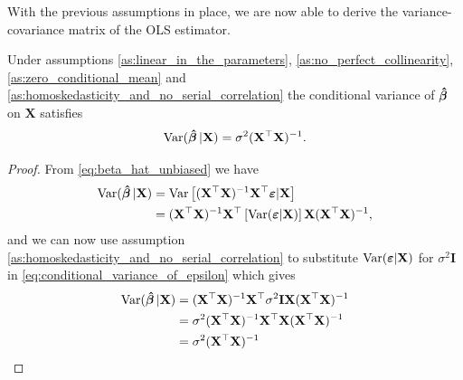 With the previous assumptions in place, we are now able to derive the variance-covariance matrix of the OLS estimator.
\begin{theorem}\label{th:variance-covariance_of_the_ols_estimator}
    Under assumptions \ref{as:linear_in_the_parameters}, \ref{as:no_perfect_collinearity}, \ref{as:zero_conditional_mean} and \ref{as:homoskedasticity_and_no_serial_correlation} the conditional variance of $\operatorname{\boldsymbol{\hat{\beta}}}$ on $\mathbf{X}$ satisfies
    \begin{align*}
        \operatorname{\text{Var}}(\operatorname{\boldsymbol{\hat{\beta}}} | \mathbf{X}) = \sigma^2(\mathbf{X}^\top\mathbf{X})^{-1}.
    \end{align*}
\end{theorem}
\begin{proof}
    From \eqref{eq:beta_hat_unbiased} we have
    \begin{align}
        \operatorname{\text{Var}}(\operatorname{\boldsymbol{\hat{\beta}}} | \mathbf{X}) &= \operatorname{\text{Var}}\left[ (\mathbf{X}^\top\mathbf{X})^{-1}\mathbf{X}^\top\boldsymbol{\varepsilon}|\mathbf{X} \right] \nonumber\\
        &= (\mathbf{X}^\top\mathbf{X})^{-1}\mathbf{X}^\top\left[ \operatorname{\text{Var}}(\boldsymbol{\varepsilon} | \mathbf{X}) \right] \mathbf{X}(\mathbf{X}^\top\mathbf{X})^{-1}, \label{eq:conditional_variance_of_epsilon}
    \end{align}
    and we can now use assumption \ref{as:homoskedasticity_and_no_serial_correlation} to substitute $\operatorname{\text{Var}}(\boldsymbol{\varepsilon}|\mathbf{X})$ for $\sigma^2 \mathbf{I}$ in \eqref{eq:conditional_variance_of_epsilon} which gives
    \begin{align*}
        \operatorname{\text{Var}}(\operatorname{\boldsymbol{\hat{\beta}}} | \mathbf{X}) &= (\mathbf{X}^\top\mathbf{X})^{-1}\mathbf{X}^\top\sigma^2 \mathbf{I} \mathbf{X}(\mathbf{X}^\top\mathbf{X})^{-1} \\
        &= \sigma^2(\mathbf{X}^\top\mathbf{X})^{-1}\mathbf{X}^\top \mathbf{X}(\mathbf{X}^\top\mathbf{X})^{-1} \\
        &= \sigma^2(\mathbf{X}^\top\mathbf{X})^{-1}
    \end{align*}
\end{proof}

